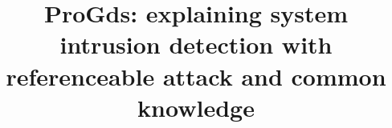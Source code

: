 \usepackage[utf8]{inputenc}
\usepackage{amsmath, amsthm, amssymb}
\newtheorem{definition}{Definition}



\newcommand{\yd}[1]{\textcolor{blue}{#1}}



\newcommand{\dc}{datacenter\xspace}
\newcommand{\tool}{{\sf ProGds}\xspace}


\date{}

\title{\Large \bf \tool: explaining system intrusion detection with referenceable attack and common knowledge}


\maketitle













